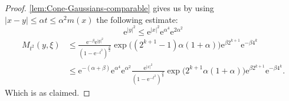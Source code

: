 \documentclass[a4paper,oneside,10pt]{amsproc}
\theoremstyle{remark}
\renewcommand{\leq}{\leqslant}
\renewcommand{\leq}{\leqslant}
\newcommand{\e}{\mathrm{e}} %
\renewcommand{\leq}{\leqslant}%
\begin{document}
\begin{proof}
  \autoref{lem:Cone-Gaussians-comparable} gives us
  by using $|x - y| \leq \alpha t \leq \alpha^2 m(x)$ the following estimate:
  \begin{equation*}
    \e^{|y|^2} \leq \e^{|x|^2}  \e^{\alpha^4} \e^{2\alpha^2}
  \end{equation*}
  \begin{align*}
    M_{t^2}(y, \xi) &\leq \frac{\e^{-\beta} \e^{|y|^2}}{(1 - \e^{-t^2})^{\frac{d}2}}
    \exp\bigl((2^{k + 1} - 1) \alpha (1 + \alpha) \bigr) \e^{\beta
      2^{k + 1}} \e^{-\beta 4^k}\\
    &\leq \e^{-(\alpha + \beta)} \e^{\alpha^4} \e^{\alpha^2} \frac{ \e^{|x|^2} }{(1 - \e^{-t^2})^{\frac{d}2}}
    \exp\bigl(2^{k + 1} \alpha (1 + \alpha) \bigr)  \e^{\beta 2^{k + 1}} \e^{-\beta 4^k}.
  \end{align*}
  Which is as claimed.
\end{proof}
\end{document}
